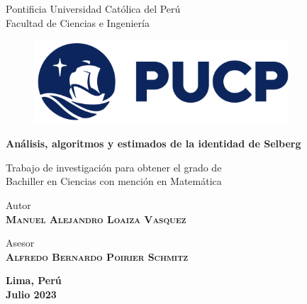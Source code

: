 \thispagestyle{empty}

\bigskip

\begin{center}
  {\baselineskip=30pt \Large Pontificia Universidad Cat\'olica del Per\'u} \\
  {\baselineskip=30pt \large Facultad de Ciencias e Ingenier\'ia}
\end{center}

\bigskip

\begin{figure}[H]
  \begin{center}
    \includegraphics[width=9.5cm]{images/2021-pucp-logo.png}
  \end{center}
\end{figure}

\begin{center}
  \begin{minipage}{14.0cm}
    \begin{center}
      {\textbf{\huge{An\'alisis, algoritmos y estimados de la identidad de Selberg}}}
    \end{center}
  \end{minipage}
\end{center}

\vspace*{1.00cm}

\begin{center}
  Trabajo de investigaci\'on para obtener el grado de \\
  Bachiller en Ciencias con menci\'on en Matem\'atica
\end{center}

\vspace*{1.00cm}

\begin{center}
  Autor \\
  \textbf{\textsc{Manuel Alejandro Loaiza Vasquez}}
\end{center}

\vspace*{0.5cm}

\begin{center}
  Asesor \\
  \textbf{\textsc{Alfredo Bernardo Poirier Schmitz}}
\end{center}

\vspace*{0.5cm}

\begin{center}
  {
    \baselineskip=10pt
    \textbf{Lima, Per\'u} \\
    \textbf{Julio 2023}
  }
\end{center}
